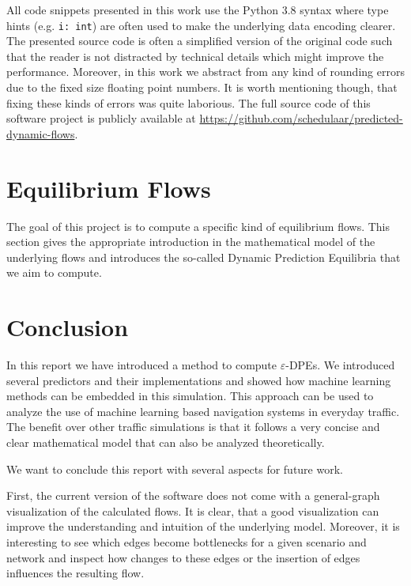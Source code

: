 \documentclass[titlepage]{scrartcl}
\theoremstyle{definition}
\newcommand{\code}[1]{\texttt{#1}}
\begin{document}
    All code snippets presented in this work use the Python 3.8 syntax where type hints (e.g. \code{i: int}) are often used to make the underlying data encoding clearer.
    The presented source code is often a simplified version of the original code such that the reader is not distracted by technical details which might improve the performance.
    Moreover, in this work we abstract from any kind of rounding errors due to the fixed size floating point numbers.
    It is worth mentioning though, that fixing these kinds of errors was quite laborious. 
    The full source code of this software project is publicly available at \url{https://github.com/schedulaar/predicted-dynamic-flows}.

    \clearpage
    

    \clearpage
    \section{Equilibrium Flows}\label{sec:equilibrium-flows}

    The goal of this project is to compute a specific kind of equilibrium flows.
    This section gives the appropriate introduction in the mathematical model of the underlying flows and introduces the so-called Dynamic Prediction Equilibria that we aim to compute.
    
    
    

    \clearpage
    
    
    \clearpage
    

    \clearpage
    \section{Conclusion}

    In this report we have introduced a method to compute $\varepsilon$-DPEs.
    We introduced several predictors and their implementations and showed how machine learning methods can be embedded in this simulation.
    This approach can be used to analyze the use of machine learning based navigation systems in everyday traffic.
    The benefit over other traffic simulations is that it follows a very concise and clear mathematical model that can also be analyzed theoretically.

    We want to conclude this report with several aspects for future work.

    First, the current version of the software does not come with a general-graph visualization of the calculated flows.
    It is clear, that a good visualization can improve the understanding and intuition of the underlying model.
    Moreover, it is interesting to see which edges become bottlenecks for a given scenario and network and inspect how changes to these edges or the insertion of edges influences the resulting flow.
\end{document}
